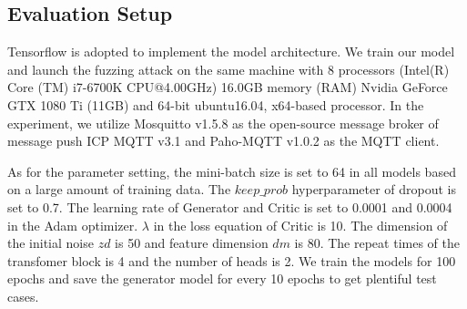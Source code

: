 \subsection{Evaluation Setup}

Tensorflow is adopted to implement the model architecture. We train our model  and launch the fuzzing attack on the same machine with 8 processors (Intel(R) Core (TM) i7-6700K CPU@4.00GHz)  16.0GB memory (RAM) Nvidia GeForce GTX 1080 Ti (11GB) and 64-bit ubuntu16.04, x64-based processor. In the experiment, we utilize Mosquitto v1.5.8 \cite{light2017mosquitto} as the open-source message broker of message push ICP MQTT v3.1 and  Paho-MQTT v1.0.2 as the MQTT client.

As for the parameter setting, the mini-batch size is set to 64 in all models based on a large amount of training data. The $keep\_prob$ hyperparameter of dropout is set to 0.7. The learning rate of Generator and Critic is set to 0.0001 and 0.0004 in the Adam optimizer. $\lambda$ in the loss equation of Critic is 10. The dimension of the initial noise $zd$ is 50 and feature dimension $dm$ is 80. The repeat times of the transfomer block is 4 and the number of heads is 2. We train the models for 100 epochs and save the generator model for every 10 epochs to get plentiful test cases.



